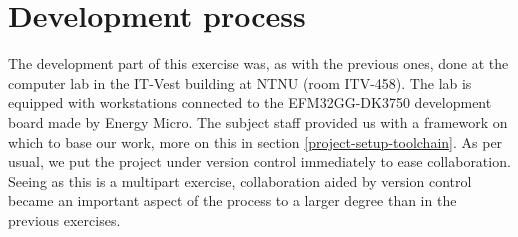 \section{Development process}

The development part of this exercise was, as with the previous ones, done at the computer lab in the IT-Vest building at NTNU (room ITV-458). The lab is equipped with workstations connected to the EFM32GG-DK3750 development board made by Energy Micro.
The subject staff provided us with a framework on which to base our work, more on this in section \ref{project-setup-toolchain}.
As per usual, we put the project under version control immediately to ease collaboration. Seeing as this is a multipart exercise, collaboration aided by version control became an important aspect of the process to a larger degree than in the previous exercises.

